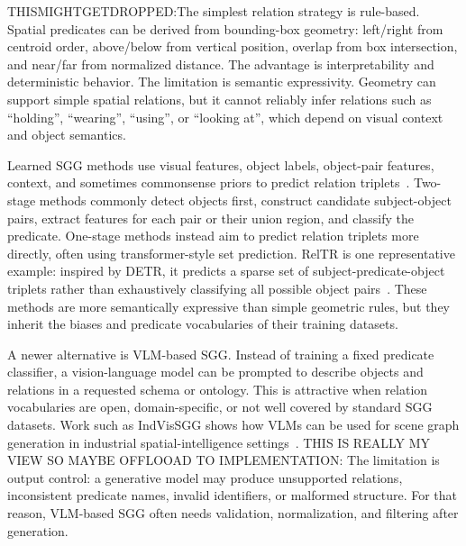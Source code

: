 
THISMIGHTGETDROPPED:The simplest relation strategy is rule-based. Spatial predicates can be derived from bounding-box geometry: left/right from centroid order, above/below from vertical position, overlap from box intersection, and near/far from normalized distance. The advantage is interpretability and deterministic behavior. The limitation is semantic expressivity. Geometry can support simple spatial relations, but it cannot reliably infer relations such as \enquote{holding}, \enquote{wearing}, \enquote{using}, or \enquote{looking at}, which depend on visual context and object semantics.

Learned SGG methods use visual features, object labels, object-pair features, context, and sometimes commonsense priors to predict relation triplets~\cite{zhu_scene_2022}. Two-stage methods commonly detect objects first, construct candidate subject-object pairs, extract features for each pair or their union region, and classify the predicate. One-stage methods instead aim to predict relation triplets more directly, often using transformer-style set prediction. RelTR is one representative example: inspired by DETR, it predicts a sparse set of subject-predicate-object triplets rather than exhaustively classifying all possible object pairs~\cite{cong_reltr_2023}. These methods are more semantically expressive than simple geometric rules, but they inherit the biases and predicate vocabularies of their training datasets.

A newer alternative is VLM-based SGG. Instead of training a fixed predicate classifier, a vision-language model can be prompted to describe objects and relations in a requested schema or ontology. This is attractive when relation vocabularies are open, domain-specific, or not well covered by standard SGG datasets. Work such as IndVisSGG shows how VLMs can be used for scene graph generation in industrial spatial-intelligence settings~\cite{wang_indvissgg_2025}. THIS IS REALLY MY VIEW SO MAYBE OFFLOOAD TO IMPLEMENTATION: The limitation is output control: a generative model may produce unsupported relations, inconsistent predicate names, invalid identifiers, or malformed structure. For that reason, VLM-based SGG often needs validation, normalization, and filtering after generation.

